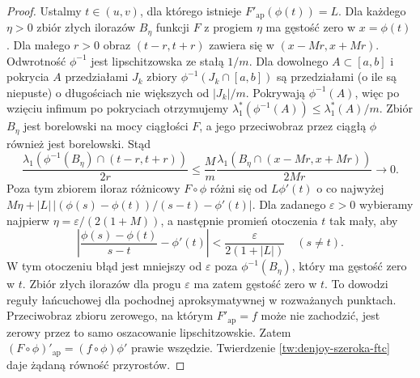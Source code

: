 \begin{proof}
Ustalmy $t\in(u,v)$, dla którego istnieje $F'_{\mathrm{ap}}(\phi(t))=L$. Dla każdego $\eta>0$ zbiór złych ilorazów $B_\eta$ funkcji $F$ z progiem $\eta$ ma gęstość zero w $x=\phi(t)$. Dla małego $r>0$ obraz $(t-r,t+r)$ zawiera się w $(x-Mr,x+Mr)$. Odwrotność $\phi^{-1}$ jest lipschitzowska ze stałą $1/m$.
Dla dowolnego $A\subset[a,b]$ i pokrycia $A$ przedziałami
$J_k$ zbiory $\phi^{-1}(J_k\cap[a,b])$ są przedziałami
(o ile są niepuste) o długościach nie większych od $|J_k|/m$.
Pokrywają $\phi^{-1}(A)$, więc po wzięciu infimum po pokryciach
otrzymujemy $\lambda_1^*(\phi^{-1}(A))\le\lambda_1^*(A)/m$. Zbiór $B_\eta$ jest borelowski na mocy ciągłości $F$, a jego przeciwobraz przez ciągłą $\phi$ również jest borelowski. Stąd
\[
 \frac{\lambda_1(\phi^{-1}(B_\eta)\cap(t-r,t+r))}{2r}
 \le \frac{M}{m}
 \frac{\lambda_1(B_\eta\cap(x-Mr,x+Mr))}{2Mr}\longrightarrow0.
\]
Poza tym zbiorem iloraz różnicowy $F\circ\phi$ różni się od $L\phi'(t)$ o co najwyżej $M\eta+|L|\,|(\phi(s)-\phi(t))/(s-t)-\phi'(t)|$. Dla zadanego $\varepsilon>0$ wybieramy najpierw
$\eta=\varepsilon/(2(1+M))$, a następnie promień
otoczenia $t$ tak mały, aby
\[
 \left|\frac{\phi(s)-\phi(t)}{s-t}-\phi'(t)\right|
 <\frac{\varepsilon}{2(1+|L|)}
 \quad (s\ne t).
\]
W tym otoczeniu błąd jest mniejszy od $\varepsilon$
poza $\phi^{-1}(B_\eta)$, który ma gęstość zero w $t$.
Zbiór złych ilorazów dla progu $\varepsilon$ ma zatem
gęstość zero w $t$. To dowodzi reguły łańcuchowej
dla pochodnej aproksymatywnej w rozważanych punktach. Przeciwobraz zbioru zerowego, na którym $F'_{\mathrm{ap}}=f$ może nie zachodzić, jest zerowy przez to samo oszacowanie lipschitzowskie. Zatem $(F\circ\phi)'_{\mathrm{ap}}=(f\circ\phi)\phi'$ prawie wszędzie. Twierdzenie \ref{tw:denjoy-szeroka-ftc} daje żądaną równość przyrostów.
\end{proof}

